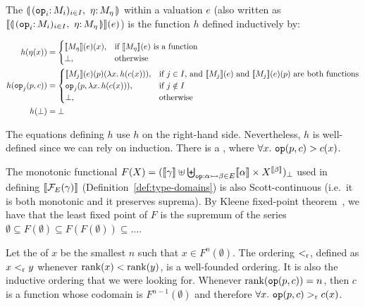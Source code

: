 \begin{definition}\label{def:banana-denotation}
  The  $\cibanana$ within a valuation
  $e$ (also written as $\sem{\cibanana}(e)$) is the function $h$ defined
  inductively by:

  \begin{align*}
    h(\eta(x)) &= \begin{cases}
      \llbracket M_\eta \rrbracket(e)(x), & \text{if $\llbracket M_\eta \rrbracket(e)$ is a function} \\
      \bot, & \text{otherwise} \\
    \end{cases} \\
    h(\mathtt{op}_j(p, c)) &= \begin{cases} 
      \llbracket M_j \rrbracket(e)(p)(\lambda x.\, h(c(x))), & \text{if $j \in I$, and $\llbracket M_j \rrbracket(e)$ and $\llbracket M_j \rrbracket(e)(p)$ are both functions} \\
      \mathtt{op}_j(p, \lambda x.\, h(c(x))), & \text{if $j \notin I$} \\
      \bot, & \text{otherwise} \\
    \end{cases} \\
    h(\bot) &= \bot
  \end{align*}
  
  The equations defining $h$ use $h$ on the right-hand side. Nevertheless,
  $h$ is well-defined since we can rely on induction. There is a
  ,
  where $\forall x.\ \mathtt{op}(p, c) > c(x)$.

  The monotonic functional
  $F(X) = (\llbracket \gamma \rrbracket \uplus \biguplus_{\mathtt{op} : \alpha \rightarrowtail \beta \in
    E} \llbracket \alpha \rrbracket \times X^{\llbracket \beta \rrbracket})_\bot$ used in defining
  $\llbracket \mathcal{F}_E(\gamma) \rrbracket$ (Definition~\ref{def:type-domains}) is also
  Scott-continuous (i.e.\ it is both monotonic and it preserves
  suprema). By Kleene fixed-point theorem~\cite{kleene1952introduction}, we
  have that the least fixed point of $F$ is the supremum of the series
  $\emptyset \subseteq F(\emptyset) \subseteq F(F(\emptyset)) \subseteq
  \ldots$.

  Let the  of $x$ be the smallest $n$ such that
  $x \in F^n(\emptyset)$. The ordering $<_{\mathrm{r}}$, defined as
  $x <_{\mathrm{r}} y$ whenever $\operatorname{rank}(x) < \operatorname{rank}(y)$, is a well-founded
  ordering. It is also the inductive ordering that we were looking
  for. Whenever $\operatorname{rank}(\mathtt{op}(p, c)) = n$, then $c$ is a function whose
  codomain is $F^{n-1}(\emptyset)$ and therefore
  $\forall x.\ \mathtt{op}(p, c) >_{\mathrm{r}} c(x)$.
\end{definition}

